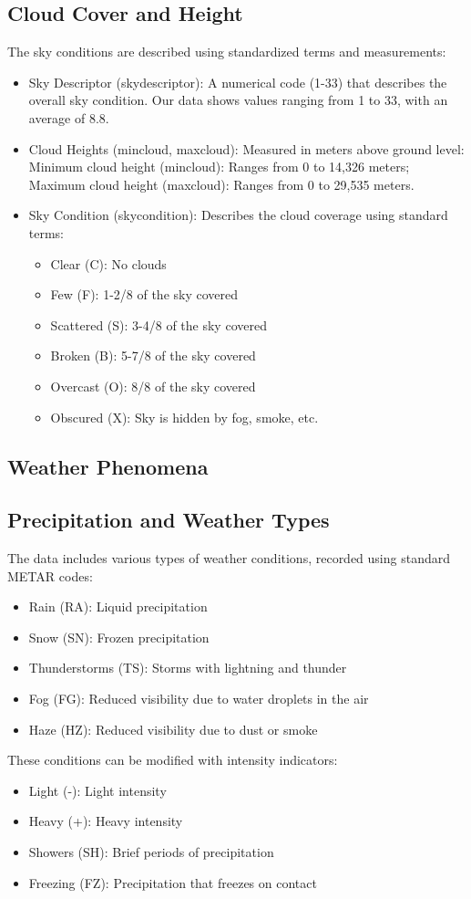 \subsection{Cloud Cover and Height}
The sky conditions are described using standardized terms and measurements:\begin{itemize}
  \item Sky Descriptor (skydescriptor): A numerical code (1-33) that describes the overall sky condition. Our data shows values ranging from 1 to 33, with an average of 8.8.
  \item Cloud Heights (mincloud, maxcloud): Measured in meters above ground level: Minimum cloud height (mincloud): Ranges from 0 to 14,326 meters; Maximum cloud height (maxcloud): Ranges from 0 to 29,535 meters.
  \item Sky Condition (skycondition): Describes the cloud coverage using standard terms:\begin{itemize}
  \item Clear (C): No clouds
  \item Few (F): 1-2/8 of the sky covered
  \item Scattered (S): 3-4/8 of the sky covered
  \item Broken (B): 5-7/8 of the sky covered
  \item Overcast (O): 8/8 of the sky covered
  \item Obscured (X): Sky is hidden by fog, smoke, etc.
\end{itemize}

\end{itemize}


\subsection{Weather Phenomena}
\subsection{Precipitation and Weather Types}
The data includes various types of weather conditions, recorded using standard METAR codes:\begin{itemize}
  \item Rain (RA): Liquid precipitation
  \item Snow (SN): Frozen precipitation
  \item Thunderstorms (TS): Storms with lightning and thunder
  \item Fog (FG): Reduced visibility due to water droplets in the air
  \item Haze (HZ): Reduced visibility due to dust or smoke
\end{itemize}
These conditions can be modified with intensity indicators:\begin{itemize}
  \item Light (-): Light intensity
  \item Heavy (+): Heavy intensity
  \item Showers (SH): Brief periods of precipitation
  \item Freezing (FZ): Precipitation that freezes on contact
\end{itemize}

